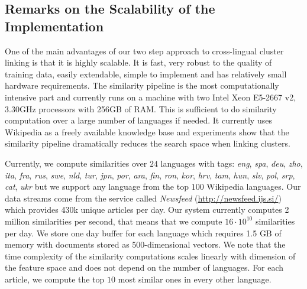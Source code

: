 \subsection{Remarks on the Scalability of the Implementation}

One of the main advantages of our two step approach to cross-lingual cluster linking is that it is highly scalable.
It is fast, very robust to the quality of training data, easily extendable, simple to implement
and has relatively small hardware requirements. The similarity pipeline is the most computationally
intensive part and currently runs on a machine with two Intel Xeon E5-2667 v2, 3.30GHz processors
with 256GB of RAM. This is sufficient to do similarity computation over a large number of
languages if needed. It currently uses Wikipedia as a freely available knowledge base
and experiments show that the similarity pipeline dramatically reduces the search space when linking clusters.

Currently, we compute similarities over $24$ languages with
tags: \emph{eng}, \emph{spa}, \emph{deu}, \emph{zho}, \emph{ita}, \emph{fra}, \emph{rus},
\emph{swe}, \emph{nld}, \emph{tur}, \emph{jpn}, \emph{por}, \emph{ara}, \emph{fin},
\emph{ron}, \emph{kor}, \emph{hrv}, \emph{tam}, \emph{hun}, \emph{slv}, \emph{pol},
\emph{srp}, \emph{cat}, \emph{ukr} but we support any language from the top $100$ Wikipedia languages.
Our data streams come from the service called \emph{Newsfeed} (\url{http://newsfeed.ijs.si/})
which provides 430k unique articles per day.
Our system currently computes 2 million similarities per second, that means that we
compute $16 \cdot 10^{10}$ similarities per day. We
store one day buffer for each language which requires 1.5 GB of memory with documents
stored as 500-dimensional vectors. We note that the time complexity of the similarity
computations scales linearly with dimension of the feature space and does not
depend on the number of languages. For each article, we compute the top $10$ most
similar ones in every other language.


